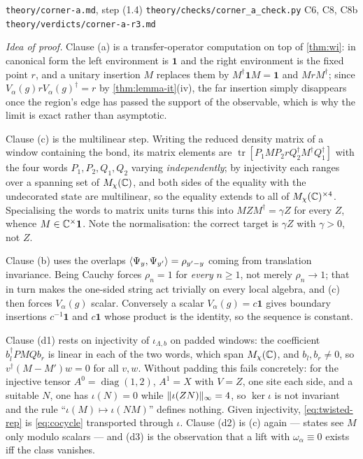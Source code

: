 %
{\texttt{theory/corner-a.md}, step (1.4)}%
{\texttt{theory/checks/corner\_a\_check.py} C6, C8, C8b}%
{\texttt{theory/verdicts/corner-a-r3.md}}

\smallskip\noindent\textit{Idea of proof.}
Clause (a) is a transfer-operator computation on top of \cref{thm:wi}: in
canonical form the left environment is $\mathbf{1}$ and the right environment is
the fixed point $r$, and a unitary insertion $M$ replaces them by
$M^\dagger\mathbf{1}M=\mathbf{1}$ and $MrM^\dagger$; since
$V_\alpha(g)rV_\alpha(g)^\dagger=r$ by \cref{thm:lemma-it}(iv), the far insertion
simply disappears once the region's edge has passed the support of the
observable, which is why the limit is exact rather than asymptotic.

Clause (c) is the multilinear step.  Writing the reduced density matrix of a
window containing the bond, its matrix elements are
$\operatorname{tr}[P_1MP_2rQ_2^\dagger M^\dagger Q_1^\dagger]$ with the four words
$P_1,P_2,Q_1,Q_2$ varying \emph{independently}; by injectivity each ranges over a
spanning set of $M_\chi(\mathbb{C})$, and both sides of the equality with the undecorated
state are multilinear, so the equality extends to all of $M_\chi(\mathbb{C})^{\times4}$.
Specialising the words to matrix units turns this into $MZM^\dagger=\gamma Z$ for
every $Z$, whence $M\in\mathbb{C}^\times\mathbf{1}$.  Note the normalisation:  the
correct target is $\gamma Z$ with $\gamma>0$, not $Z$.

Clause (b) uses the overlaps $\langle \Psi_y,\Psi_{y'}\rangle=\rho_{y'-y}$ coming from
translation invariance.  Being Cauchy forces $\rho_n=1$ for \emph{every} $n\ge1$,
not merely $\rho_n\to1$; that in turn makes the one-sided string act trivially on
every local algebra, and (c) then forces $V_\alpha(g)$ scalar.  Conversely a
scalar $V_\alpha(g)=c\mathbf{1}$ gives boundary insertions $c^{-1}\mathbf{1}$ and
$c\mathbf{1}$ whose product is the identity, so the sequence is constant.

Clause (d1) rests on injectivity of $\iota_{\Lambda,b}$ on padded windows: the
coefficient $b_l^\dagger PMQb_r$ is linear in each of the two words, which span
$M_\chi(\mathbb{C})$, and $b_l,b_r\neq0$, so $v^\dagger(M-M')w=0$ for all $v,w$.  Without
padding this fails concretely: for the injective tensor $A^0=\operatorname{diag}(1,2)$,
$A^1=X$ with $V=Z$, one site each side, and a suitable $N$, one has
$\iota(N)=0$ while $\lVert \iota(ZN)\rVert_\infty=4$, so $\ker\iota$ is not invariant
and the rule ``$\iota(M)\mapsto\iota(NM)$'' defines nothing.  Given injectivity,
\cref{eq:twisted-rep} is \cref{eq:cocycle} transported through $\iota$.  Clause
(d2) is (c) again --- states see $M$ only modulo scalars --- and (d3) is the
observation that a lift with $\omega_\alpha\equiv0$ exists iff the class vanishes.

